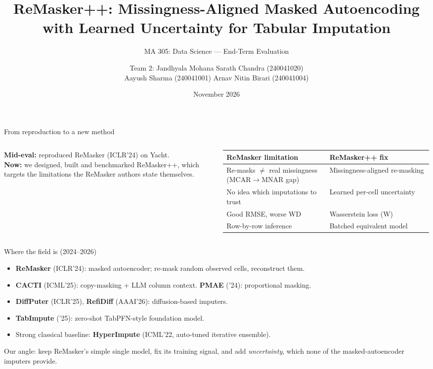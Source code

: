 \documentclass[aspectratio=169,11pt]{beamer}
\title{ReMasker++: Missingness-Aligned Masked Autoencoding\\with Learned Uncertainty for Tabular Imputation}
\subtitle{MA 305: Data Science --- End-Term Evaluation}
\author{\small Team 2: Jandhyala Mohana Sarath Chandra (240041020)\\ Aayush Sharma (240041001) \quad Arnav Nitin Birari (240041004)}
\institute{Instructor: Prof.\ M.\ Tanveer \hfill \texttt{github.com/sunno-bhaato/remasker\_pp}}
\date{November 2026}
\newcommand{\rmpp}{ReMasker++}
\begin{document}
\maketitle

\begin{frame}{From reproduction to a new method}
\begin{columns}[T]
\textbf{Mid-eval:} reproduced ReMasker (ICLR'24) on Yacht.\\[6pt]
\textbf{Now:} we \alert{designed, built and benchmarked} \rmpp, which targets the limitations the ReMasker authors state themselves.
\small
\begin{tabular}{p{0.45\linewidth}p{0.45\linewidth}}
\toprule
\textbf{ReMasker limitation} & \textbf{\rmpp{} fix}\\\midrule
Re-masks $\ne$ real missingness (MCAR$\to$MNAR gap) & Missingness-aligned re-masking\\
No idea which imputations to trust & Learned per-cell uncertainty\\
Good RMSE, worse WD & Wasserstein loss (W)\\
Row-by-row inference & Batched equivalent model\\\bottomrule
\end{tabular}
\end{columns}
\end{frame}

\begin{frame}{Where the field is (2024--2026)}
\begin{itemize}
\item \textbf{ReMasker} (ICLR'24): masked autoencoder; re-mask random observed cells, reconstruct them.
\item \textbf{CACTI} (ICML'25): copy-masking + LLM column context. \textbf{PMAE} ('24): proportional masking.
\item \textbf{DiffPuter} (ICLR'25), \textbf{RefiDiff} (AAAI'26): diffusion-based imputers.
\item \textbf{TabImpute} ('25): zero-shot TabPFN-style foundation model.
\item Strong classical baseline: \textbf{HyperImpute} (ICML'22, auto-tuned iterative ensemble).
\end{itemize}
\vspace{4pt}
\alert{Our angle:} keep ReMasker's simple single model, fix its training signal, and add \emph{uncertainty}, which none of the masked-autoencoder imputers provide.
\end{frame}
\end{document}
